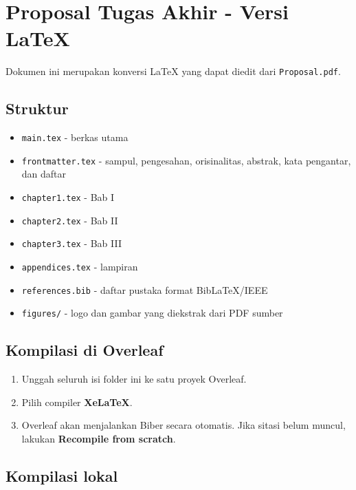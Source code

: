 \documentclass[
]{article}
\author{}
\date{}
\providecommand{\tightlist}{%
  \setlength{\itemsep}{0pt}\setlength{\parskip}{0pt}}
\begin{document}
\section{Proposal Tugas Akhir - Versi
LaTeX}\label{proposal-tugas-akhir---versi-latex}

Dokumen ini merupakan konversi LaTeX yang dapat diedit dari
\texttt{Proposal.pdf}.

\subsection{Struktur}\label{struktur}

\begin{itemize}
\tightlist
\item
  \texttt{main.tex} - berkas utama
\item
  \texttt{frontmatter.tex} - sampul, pengesahan, orisinalitas, abstrak,
  kata pengantar, dan daftar
\item
  \texttt{chapter1.tex} - Bab I
\item
  \texttt{chapter2.tex} - Bab II
\item
  \texttt{chapter3.tex} - Bab III
\item
  \texttt{appendices.tex} - lampiran
\item
  \texttt{references.bib} - daftar pustaka format BibLaTeX/IEEE
\item
  \texttt{figures/} - logo dan gambar yang diekstrak dari PDF sumber
\end{itemize}

\subsection{Kompilasi di Overleaf}\label{kompilasi-di-overleaf}

\begin{enumerate}
\def\labelenumi{\arabic{enumi}.}
\tightlist
\item
  Unggah seluruh isi folder ini ke satu proyek Overleaf.
\item
  Pilih compiler \textbf{XeLaTeX}.
\item
  Overleaf akan menjalankan Biber secara otomatis. Jika sitasi belum
  muncul, lakukan \textbf{Recompile from scratch}.
\end{enumerate}

\subsection{Kompilasi lokal}\label{kompilasi-lokal}
\end{document}
